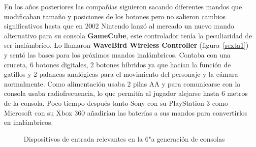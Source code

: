 En los a\~nos posteriores las compa\~n\'ias siguieron sacando diferentes mandos que modificaban tama\~no y posiciones de los botones pero no salieron cambios significativos hasta que en 2002 Nintendo lanz\'o al mercado un nuevo mando alternativo para su consola \textbf{GameCube}, este controlador ten\'ia la peculiaridad de ser inal\'ambrico. Lo llamaron \textbf{WaveBird Wireless Controller} (figura~\ref{sexta1}) y sent\'o las bases para los pr\'oximos mandos inal\'ambricos. Contaba con una cruceta, 6 botones digitales, 2 botones h\'ibridos ya que hac\'ian la funci\'on de gatillos y 2 palancas anal\'ogicas para el movimiento del personaje y la c\'amara normalmente. Como alimentaci\'on usaba 2 pilas AA y para comunicarse con la consola usaba radiofrecuencia, lo que permit\'ia al jugador alejarse hasta 6 metros de la consola. Poco tiempo despu\'es tanto Sony con su PlayStation 3 como Microsoft con su Xbox 360 a\~nadir\'ian las bater\'ias a sus mandos para convertirlos en inal\'ambricos. \\


\begin{figure}[t]
     \hfill
{}
     \caption{Dispositivos de entrada relevantes en la 6"a  generaci\'on de consolas}
     \label{fig:sexta}
   \end{figure}

